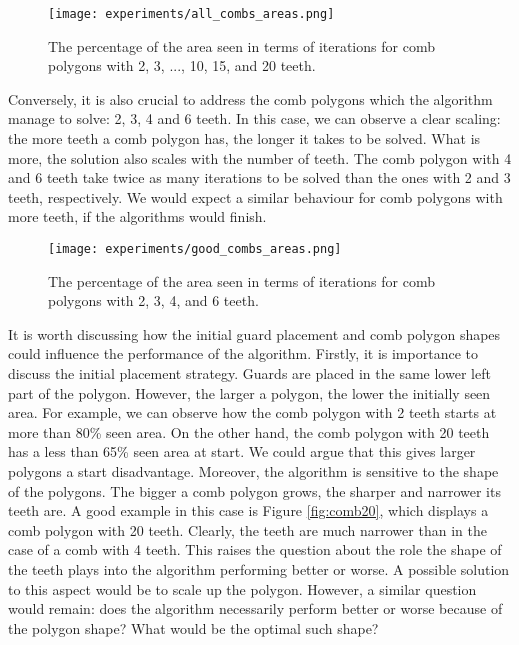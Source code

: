 \begin{figure}[h!]
    \centering
    \texttt{[image: experiments/all\_combs\_areas.png]}
    \caption{The percentage of the area seen in terms of iterations for comb polygons with 2, 3, ..., 10, 15, and 20 teeth.}
    \label{fig:all_combs}
\end{figure}

Conversely, it is also crucial to address the comb polygons which the algorithm manage to solve: 2, 3, 4 and 6 teeth. In this case, we can observe a clear scaling: the more teeth a comb polygon has, the longer it takes to be solved. What is more, the solution also scales with the number of teeth. The comb polygon with 4 and 6 teeth take twice as many iterations to be solved than the ones with 2 and 3 teeth, respectively. We would expect a similar behaviour for comb polygons with more teeth, if the algorithms would finish.

\begin{figure}[h!]
    \centering
    \texttt{[image: experiments/good\_combs\_areas.png]}
    \caption{The percentage of the area seen in terms of iterations for comb polygons with 2, 3, 4, and 6 teeth.}
    \label{fig:good_combs}
\end{figure}

It is worth discussing how the initial guard placement and comb polygon shapes could influence the performance of the algorithm.
Firstly, it is importance to discuss the initial placement strategy. Guards are placed in the same lower left part of the polygon. However, the larger a polygon, the lower the initially seen area. For example, we can observe how the comb polygon with 2 teeth starts at more than 80\% seen area. On the other hand, the comb polygon with 20 teeth has a less than 65\% seen area at start. We could argue that this gives larger polygons a start disadvantage.
Moreover, the algorithm is sensitive to the shape of the polygons. The bigger a comb polygon grows, the sharper and narrower its teeth are. A good example in this case is Figure \ref{fig:comb20}, which displays a comb polygon with 20 teeth. Clearly, the teeth are much narrower than in the case of a comb with 4 teeth. This raises the question about the role the shape of the teeth plays into the algorithm performing better or worse. A possible solution to this aspect would be to scale up the polygon. However, a similar question would remain: does the algorithm necessarily perform better or worse because of the polygon shape? What would be the optimal such shape?

